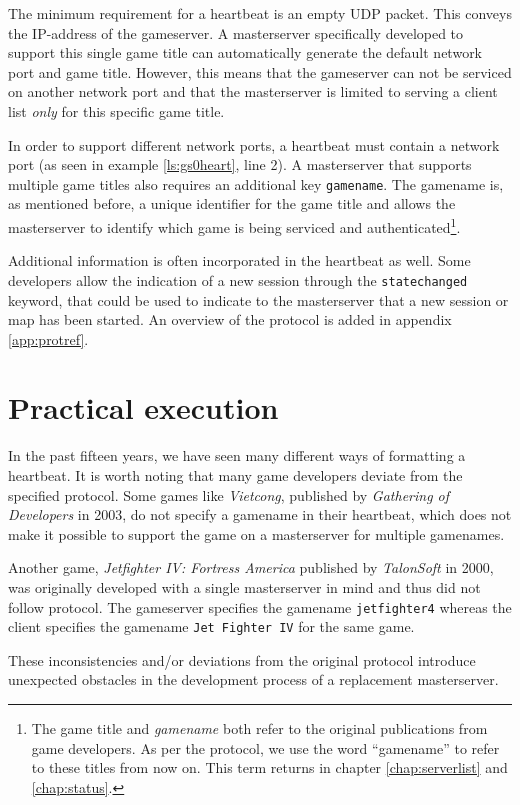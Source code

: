 The minimum requirement for a heartbeat is an empty UDP packet. This conveys the IP-address of the gameserver. A masterserver specifically developed to support this single game title can automatically generate the default network port and game title. However, this means that the gameserver can not be serviced on another network port and that the masterserver is limited to serving a client list \emph{only} for this specific game title. 

In order to support different network ports, a heartbeat must contain a network port (as seen in example \ref{ls:gs0heart}, line 2). A masterserver that supports multiple game titles also requires an additional key {\tt gamename}. The gamename is, as mentioned before, a unique identifier for the game title and allows the masterserver to identify which game is being serviced and authenticated\footnote{The game title and \emph{gamename} both refer to the original publications from game developers. As per the protocol, we use the word ``gamename'' to refer to these titles from now on. This term returns in chapter \ref{chap:serverlist} and \ref{chap:status}.}.

Additional information is often incorporated in the heartbeat as well. Some developers allow the indication of a new session through the {\tt statechanged} keyword, that could be used to indicate to the masterserver that a new session or map has been started. An overview of the protocol is added in appendix \ref{app:protref}.

\section{Practical execution}
In the past fifteen years, we have seen many different ways of formatting a heartbeat. It is worth noting that many game developers deviate from the specified protocol. Some games like \emph{Vietcong}, published by \emph{Gathering of Developers} in 2003, do not specify a gamename in their heartbeat, which does not make it possible to support the game on a masterserver for multiple gamenames. 

Another game, \emph{Jetfighter IV: Fortress America} published by \emph{TalonSoft} in 2000, was originally developed with a single masterserver in mind and thus did not follow protocol. The gameserver specifies the gamename {\tt jetfighter4} whereas the client specifies the gamename {\tt Jet Fighter IV} for the same game.

These inconsistencies and/or deviations from the original protocol introduce unexpected obstacles in the development process of a replacement masterserver.
